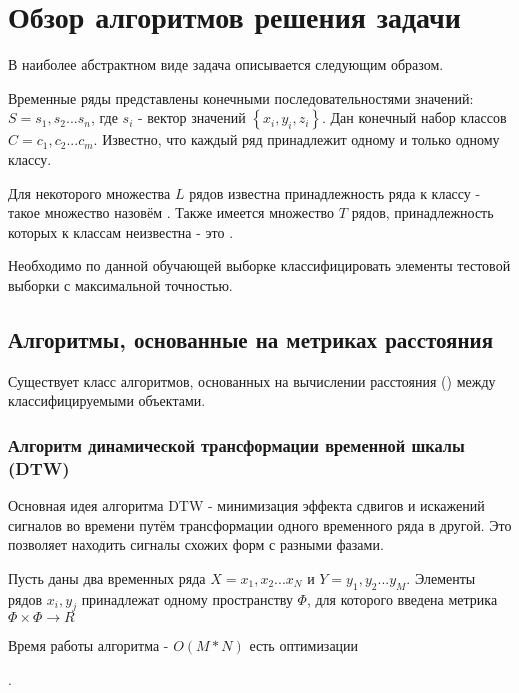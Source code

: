 
\chapter{Обзор алгоритмов решения задачи}

В наиболее абстрактном виде задача описывается следующим образом. 

Временные ряды представлены конечными последовательностями значений: $S=s_1,s_2...s_n$, где $s_i$ - вектор значений $\left\{x_i,y_i,z_i\right\}$. Дан конечный набор классов $C=c_1,c_2...c_m$. Известно, что каждый ряд принадлежит одному и только одному классу. 

Для некоторого множества $L$ рядов известна принадлежность ряда к классу - такое множество назовём . Также имеется множество $T$ рядов, принадлежность которых к классам неизвестна - это .

Необходимо по данной обучающей выборке классифицировать элементы тестовой выборки с максимальной точностью.


\section{Алгоритмы, основанные на метриках расстояния}

Существует класс алгоритмов, основанных на вычислении расстояния () между классифицируемыми объектами. 

\subsection{Алгоритм динамической трансформации временной шкалы (DTW)}

Основная идея алгоритма DTW - минимизация эффекта сдвигов и искажений сигналов во времени путём трансформации одного временного ряда в другой. Это позволяет находить сигналы схожих форм с разными фазами\cite{dtw_review}. 

Пусть даны два временных ряда $X=x_1,x_2...x_N$ и $Y=y_1,y_2...y_M$. Элементы рядов $x_i,y_j$ принадлежат одному пространству  $\Phi$, для которого введена метрика $\Phi \times \Phi \rightarrow R$

Время работы алгоритма - $O(M*N)$
есть оптимизации



. 




